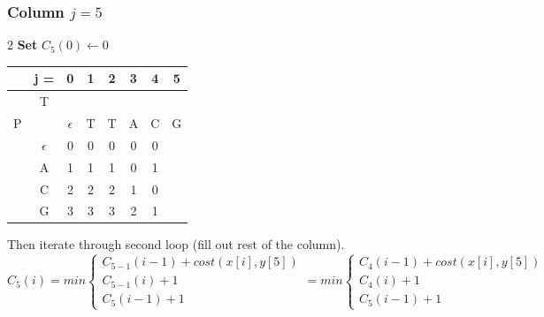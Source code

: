 \subsubsection*{Column $j = 5$}
\begin{multicols}{2}
    \textbf{Set} $C_5(0) \gets 0$

    \begin{center}
        \begin{tabular}{|c c|c|c|c|c|c|c|} \hline
        &   j =  &  0           &   1   &   2   &   3   &   4   &   5   \\ \hline
        &   T    &              &       &       &       &       &       \\
        P   &        &  $\epsilon$  &   T   &   T   &   A   &   C   &   G   \\ \hline
        & $\epsilon$ &       0      & 0     &0      & 0     &  0    &  \ccr0     \\ \hline
        &    A   &     1        &  1    &   1   & 0     & 1     &       \\ \hline
        &    C   & 2            &  2    &   2   & 1     & 0     &       \\ \hline
        &    G   & 3            &   3   &3      & 2     & 1     &       \\ \hline
        \end{tabular}
    \end{center}
\end{multicols}

Then iterate through second loop (fill out rest of the column).
\[
    C_5(i) = min \begin{cases}
                     C_{5-1}(i-1) + cost(x[i], y[5]) \\
                     C_{5-1}(i) + 1 \\
                     C_5(i-1) + 1
    \end{cases} =  min \begin{cases}
                           C_{4}(i-1) + cost(x[i], y[5]) \\
                           C_{4}(i) + 1 \\
                           C_5(i-1) + 1
    \end{cases}
\]




